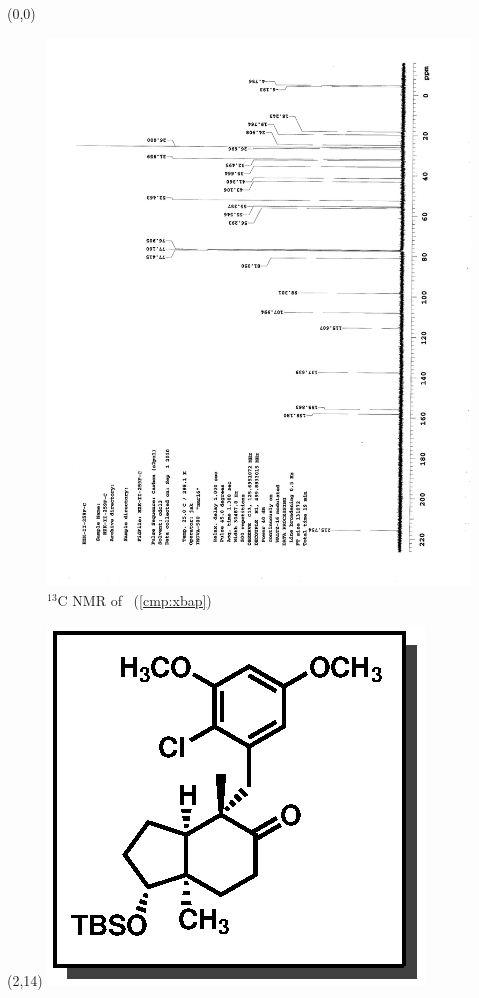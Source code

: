 \clearpage
\begin{textblock}{20}(0,0)
\begin{figure}[htb]
\caption{$^{13}$C NMR of  \CMPxbap\ (\ref{cmp:xbap})}
\includegraphics[scale=0.75, trim = 0mm 0mm 0mm 5mm,
clip]{chp_singlecarbon/images/nmr/xbapC}
\vspace{-100pt}
\end{figure}
\end{textblock}
\begin{textblock}{1}(2,14)
\includegraphics[scale=0.8, angle=90]{chp_singlecarbon/images/xbap}
\end{textblock}
\clearpage

